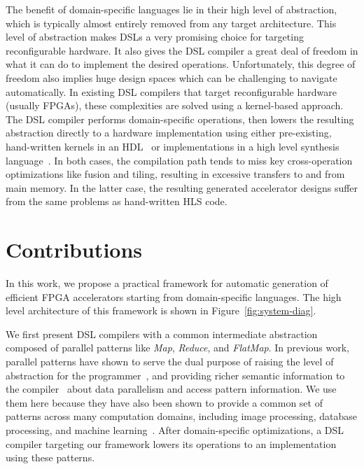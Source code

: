 The benefit of domain-specific languages lie in their
high level of abstraction, which is typically almost entirely removed from any target
architecture. This level of abstraction makes DSLs a very promising choice for targeting reconfigurable
hardware.
It also gives the DSL compiler a great deal of freedom in what it can do to implement the
desired operations. Unfortunately, this degree of freedom also implies huge design spaces
which can be challenging to navigate automatically.
In existing DSL compilers that target reconfigurable hardware (usually FPGAs),
these complexities are solved using a kernel-based approach.
The DSL compiler performs domain-specific operations, then lowers the resulting
abstraction directly to a hardware implementation using either pre-existing, hand-written kernels in
an HDL~\cite{TODO} or implementations in a high level synthesis language~\cite{george14fpl}.
In both cases, the compilation path tends to miss key cross-operation optimizations
like fusion and tiling, resulting in excessive transfers to and from main memory.
In the latter case, the resulting generated accelerator designs suffer from the
same problems as hand-written HLS code.

\section{Contributions}
In this work, we propose a practical framework for automatic generation of
efficient FPGA accelerators starting from domain-specific languages.
The high level architecture of this framework is shown in Figure~\ref{fig:system-diag}.

We first present DSL compilers with a common intermediate abstraction composed of
parallel patterns like \emph{Map}, \emph{Reduce}, and \emph{FlatMap}.
In previous work, parallel patterns have shown to serve the dual purpose of raising the
level of abstraction for the
programmer~\cite{ecoop13sujeeth,pldi13halide}, and providing richer
semantic information to the compiler~\cite{delite-tecs14} about data parallelism
and access pattern information. We use them here because they have also been shown
to provide a common set of patterns across many computation domains, including
image processing, database processing, and machine learning~\cite{pldi13halide,ecoop13sujeeth}.
After domain-specific optimizations, a DSL compiler targeting
our framework lowers its operations to an implementation using these patterns.

